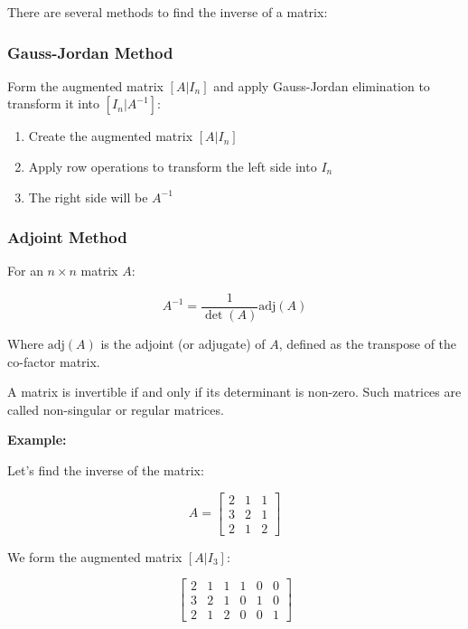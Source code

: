 There are several methods to find the inverse of a matrix:

\subsubsection{Gauss-Jordan Method}

Form the augmented matrix \([A|I_n]\) and apply Gauss-Jordan elimination to transform it into \([I_n|A^{-1}]\):

\begin{enumerate}

    \item Create the augmented matrix \([A|I_n]\)

    \item Apply row operations to transform the left side into \(I_n\)

    \item The right side will be \(A^{-1}\)

\end{enumerate}

\subsubsection{Adjoint Method}

For an \(n \times n\) matrix \(A\):

\[
    A^{-1} = \frac{1}{\det(A)} \text{adj}(A)
\]

Where \(\text{adj}(A)\) is the adjoint (or adjugate) of \(A\), defined as the transpose of the co-factor matrix.

A matrix is invertible if and only if its determinant is non-zero. Such matrices are called non-singular or regular matrices.

\textbf{Example:}

Let's find the inverse of the matrix:

\[
    A =
    \begin{bmatrix}
        2 & 1 & 1 \\
        3 & 2 & 1 \\
        2 & 1 & 2
    \end{bmatrix}
\]

We form the augmented matrix \([A|I_3]\):

\[
    \left[
    \begin{array}{ccc|ccc}
        2 & 1 & 1 & 1 & 0 & 0 \\
        3 & 2 & 1 & 0 & 1 & 0 \\
        2 & 1 & 2 & 0 & 0 & 1
    \end{array}
    \right]
\]

